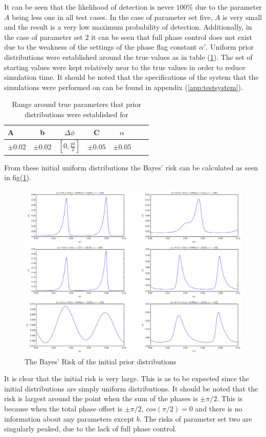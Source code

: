 It can be seen that the likelihood of detection is never $100\%$ due to the parameter $A$ being less one in all test cases. In the case of parameter set five, $A$ is very small and the result is a very low maximum probability of detection. Additionally, in the case of parameter set 2 it can be seen that full phase control does not exist due to the weakness of the settings of the phase flag constant $\alpha'$.   Uniform prior distributions were established around the true values as in table (\ref{tab:around}). The set of starting values were kept relatively near to the true values in order to reduce simulation time. It should be noted that the specifications of the system that the simulations were performed on can be found in appendix (\ref{app:testsystem}). 
\begin{table}[h]
\begin{center}
\begin{tabular}{l*{5}{c}r}
A&b& $\Delta\phi$ & C & $\alpha$ \\
\hline
 $\pm0.02$ & $\pm0.02$ & $[0,\frac{pi}{2}]$ & $\pm0.05$ & $\pm0.05$
\end{tabular}
\caption{Range around true parameters that prior distributions were established for}
\label{tab:around}
\end{center}
\end{table}
From these initial uniform distributions the Bayes' risk can be calculated as seen in fig(\ref{fig:initialdistributions}).
\begin{figure}[ht!]
\centering
\includegraphics[width=\textwidth , height=0.8\textheight]{Figures/priors.png}
\caption{The Bayes' Risk of the initial prior distributions}
\label{fig:initialdistributions}
\end{figure}
It is clear that the initial risk is very large. This is as to be expected since the initial distributions are simply uniform distributions. It should be noted that the risk is largest around the point when the sum of the phases is $\pm\pi/2$. This is because when the total phase offset is $\pm\pi/2$, $cos(\pi/2)=0$ and there is no information about any parameters except $b$. The risks of parameter set two are singularly peaked, due to the lack of full phase control. 

